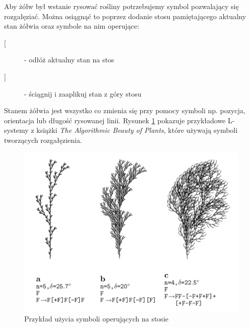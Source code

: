 \documentclass[inz,longabstract]{iithesis}
\begin{document}
            Aby żółw był wstanie rysować rośliny potrzebujemy symbol pozwalający się rozgałęziać. Można osiągnąć to poprzez dodanie stosu pamiętającego aktualny stan żółwia oraz symbole na nim operujące:
            \begin{description}
                \item[{[}] - odłóż aktualny stan na stos
                \item[{]}] - ściągnij i zaaplikuj stan z góry stosu 
            \end{description}
            Stanem żółwia jest wszystko co zmienia się przy pomocy symboli np. pozycja, orientacja lub długość rysowanej linii. Rysunek \ref{fig:lsystemPlants} pokazuje przykładowe L-systemy z książki \textit{The Algorithmic Beauty of Plants}\cite{plants}, które używają symboli tworzących rozgałęzienia. 
            \begin{figure}[H]
                \includegraphics[width=\linewidth]{lsystemPlants.png}
                \caption{Przykład użycia symboli operujących na stosie\cite{plants}} 
                \label{fig:lsystemPlants}
            \end{figure}
            
\end{document}
